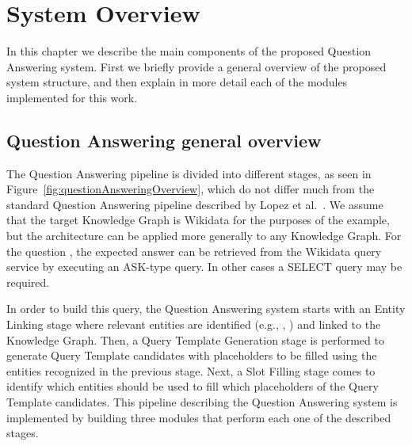 \chapter{System Overview}
\label{cap3:system}
In this chapter we describe the main components of the proposed Question Answering system. 
First we briefly provide a general overview of the proposed system structure, and then explain 
in more detail each of the modules implemented for this work.

\section{Question Answering general overview}
\label{cap3:system/qaPipeline}
The Question Answering pipeline is divided into different stages, as seen in 
Figure~\ref{fig:questionAnsweringOverview}, which do not differ much from the standard 
Question Answering pipeline described by Lopez et al.~\cite{qa:core-techniques-DiefenbachLSM18}. 
We assume that the target Knowledge Graph is Wikidata for the purposes of the example, but 
the architecture can be applied more generally to any Knowledge Graph. For the question 
, the expected answer can be retrieved from the 
Wikidata query service by executing an ASK-type \SPARQL{} query. In other cases a SELECT query may be 
required.

In order to build this \SPARQL{} query, the Question Answering system starts with an Entity 
Linking stage where relevant entities are identified (e.g., , 
) and linked to the Knowledge Graph. Then, a Query Template Generation stage 
is performed to generate \SPARQL{} Query Template candidates with placeholders to be filled 
using the entities recognized in the previous stage. Next, a Slot Filling stage comes to 
identify which entities should be used to fill which placeholders of the Query Template 
candidates. This pipeline describing the Question Answering system is implemented by building 
three modules that perform each one of the described stages. 

\newpage

